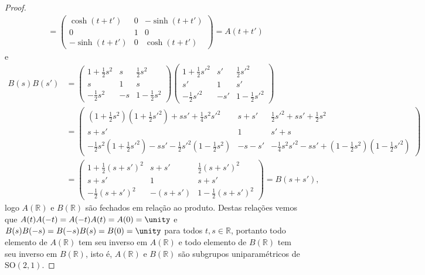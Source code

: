 \begin{proof}
\begin{align*}
        &=
        \begin{pmatrix}
            \cosh{(t + t')} & 0 & - \sinh{(t + t')}\\
            0 & 1 & 0\\
            -\sinh{(t+t')} & 0 & \cosh{(t + t')}
        \end{pmatrix} = A(t + t')
    \end{align*}
    e
    \begin{align*}
        B(s)B(s')
        &=
        \begin{pmatrix}
            1 + \frac12 s^2 & s & \frac12s^2\\
            s & 1 & s\\
            -\frac12s^2 & -s & 1 - \frac12s^2
        \end{pmatrix}
        \begin{pmatrix}
            1 + \frac12 s'^2 & s' & \frac12s'^2\\
            s' & 1 & s'\\
            -\frac12s'^2 & -s' & 1 - \frac12s'^2
        \end{pmatrix}\\
        &=
        \begin{pmatrix}
            (1 + \frac12s^2)(1 + \frac12 s'^2) + ss' + \frac14s^2s'^2 & s + s' & \frac12s'^2 + ss' + \frac12s^2\\
            s + s' & 1 & s' + s\\
            -\frac12s^2(1 + \frac12 s'^2) - ss' - \frac12s'^2(1 - \frac12s^2) & -s - s' & -\frac14s^2s'^2 - ss' + (1 - \frac12s^2)(1-\frac12s'^2)
        \end{pmatrix}\\
        &=
        \begin{pmatrix}
            1 + \frac12(s+s')^2 & s + s' & \frac12 (s + s')^2\\
            s + s' & 1  & s + s'\\
            - \frac12 ( s + s')^2 & - (s + s') & 1 - \frac12 (s + s')^2
        \end{pmatrix} = B(s + s'),
    \end{align*}
    logo \(A(\mathbb{R})\) e \(B(\mathbb{R})\) são fechados em relação ao produto. Destas relações vemos que \(A(t)A(-t) = A(-t)A(t) = A(0) = \unity\) e \(B(s)B(-s) = B(-s)B(s) = B(0) = \unity\) para todos \(t,s\in \mathbb{R}\), portanto todo elemento de \(A(\mathbb{R})\) tem seu inverso em \(A(\mathbb{R})\) e todo elemento de \(B(\mathbb{R})\) tem seu inverso em \(B(\mathbb{R})\), isto é, \(A(\mathbb{R})\) e \(B(\mathbb{R})\) são subgrupos uniparamétricos de \(\mathrm{SO}(2,1)\).


\end{proof}
